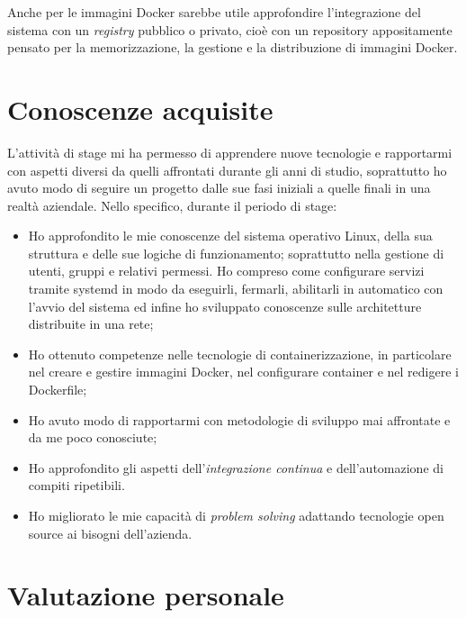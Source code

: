 Anche per le immagini Docker sarebbe utile approfondire l'integrazione del sistema con un \textit{registry} pubblico o privato, cioè con un repository appositamente pensato per la memorizzazione, la gestione e la distribuzione di immagini Docker.

\section{Conoscenze acquisite}

L'attività di stage mi ha permesso di apprendere nuove tecnologie e rapportarmi con aspetti diversi da quelli affrontati durante gli anni di studio, soprattutto ho avuto modo di seguire un progetto dalle sue fasi iniziali a quelle finali in una realtà aziendale. Nello specifico, durante il periodo di stage:

\begin{itemize}
    \item Ho approfondito le mie conoscenze del sistema operativo \gls{Linux}, della sua struttura e delle sue logiche di funzionamento; soprattutto nella gestione di utenti, gruppi e relativi permessi. Ho compreso come configurare servizi tramite \gls{systemd} in modo da eseguirli, fermarli, abilitarli in automatico con l'avvio del sistema ed infine ho sviluppato conoscenze sulle architetture distribuite in una rete; 
    \item Ho ottenuto competenze nelle tecnologie di containerizzazione, in particolare nel creare e gestire immagini Docker, nel configurare container e nel redigere i Dockerfile;
    \item Ho avuto modo di rapportarmi con metodologie di sviluppo mai affrontate e da me poco conosciute;
    \item Ho approfondito gli aspetti dell'\textit{integrazione continua} e dell'automazione di compiti ripetibili.
    \item Ho migliorato le mie capacità di \textit{problem solving} adattando tecnologie open source ai bisogni dell'azienda.
\end{itemize}

\section{Valutazione personale}

